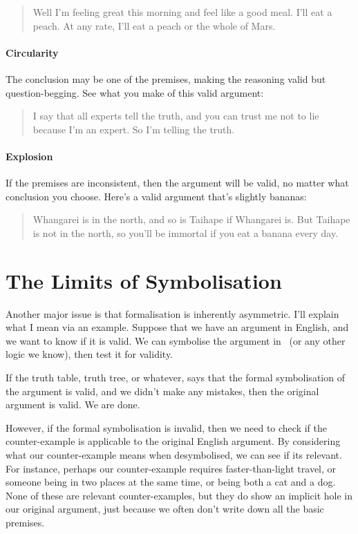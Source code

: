 \documentclass[PHIL101-Textbook.tex]{subfiles}
\begin{document}
\begin{quotation}Well I'm feeling great this morning and feel like a good meal. I'll eat a peach. At any rate, I'll eat a peach or the whole of Mars.\end{quotation}

\paragraph{Circularity} The conclusion may be one of the premises, making the reasoning valid but question-begging. See what you make of this valid argument:
\begin{quotation}I say that all experts tell the truth, and you can trust me not to lie because I'm an expert. So I'm telling the truth.\end{quotation}

\paragraph{Explosion} If the premises are inconsistent, then the argument will be valid, no matter what conclusion you choose. Here's a valid argument that's slightly bananas:
\begin{quotation} Whangarei is in the north, and so is Taihape if Whangarei is. But Taihape is not in the north, so you'll be immortal if you eat a banana every day.\end{quotation}


\pagebreak

\section*{The Limits of Symbolisation}
Another major issue is that formalisation is inherently asymmetric. I'll explain what I mean via an example. 
Suppose that we have an argument in English, and we want to know if it is valid. We can symbolise the argument in \tfl\ (or any other logic we know), then test it for validity.

If the truth table, truth tree, or whatever, says that the formal symbolisation of the argument is valid, and we didn't make any mistakes, then the original argument is valid. We are done.

However, if the formal symbolisation is invalid, then we need to check if the counter-example is applicable to the original English argument. By considering what our counter-example means when desymbolised, we can see if its relevant. For instance, perhaps our counter-example requires faster-than-light travel, or someone being in two places at the same time, or being both a cat and a dog. None of these are relevant counter-examples, but they do show an implicit hole in our original argument, just because we often don't write down all the basic premises.
\end{document}
